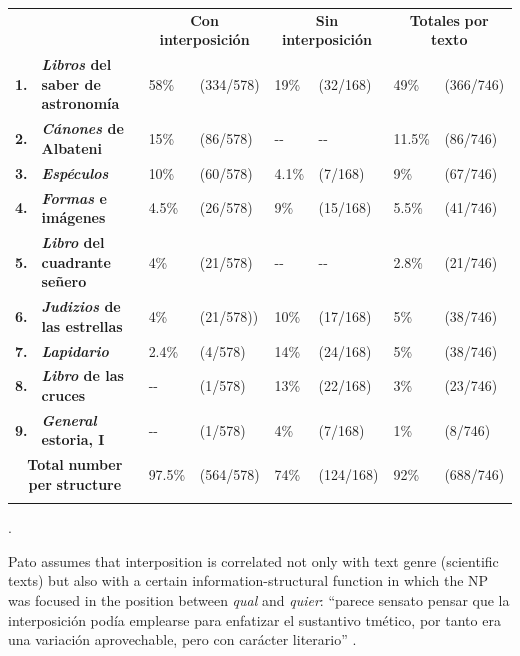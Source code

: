 \begin{table}
\begin{tabularx}{\textwidth}{XXXXXXXX}
\lsptoprule
\multicolumn{1}{c}{} &  & \multicolumn{2}{c}{ \textbf{Con} \textbf{interposición}} & \multicolumn{2}{c}{ \textbf{Sin} \textbf{interposición}} & \multicolumn{2}{c}{ \textbf{Totales} \textbf{por} \textbf{texto}}\\
\textbf{1.} & \textbf{\textit{Libros} \textbf{del} \textbf{saber} \textbf{de} \textbf{astronomía}} & 58\% & (334/578) & 19\% & (32/168) & 49\% & (366/746)\\
\textbf{2.} & \textbf{\textit{Cánones} \textbf{de} \textbf{Albateni}} & 15\% & (86/578) & {}-{}- & {}-{}- & 11.5\% & (86/746)\\
\textbf{3.} & \textbf{\textit{Espéculos}} & 10\% & (60/578) & 4.1\% & (7/168) & 9\% & (67/746)\\
\textbf{4.} & \textbf{\textit{Formas} \textbf{e} \textbf{imágenes}} & 4.5\% & (26/578) & 9\% & (15/168) & 5.5\% & (41/746)\\
\textbf{5.} & \textbf{\textit{Libro} \textbf{del} \textbf{cuadrante} \textbf{señero}} & 4\% & (21/578) & {}-{}- & {}-{}- & 2.8\% & (21/746)\\
\textbf{6.} & \textbf{\textit{Judizios} \textbf{de} \textbf{las} \textbf{estrellas}} & 4\% & (21/578)) & 10\% & (17/168) & 5\% & (38/746)\\
\textbf{7.} & \textbf{\textit{Lapidario}} & 2.4\% & (4/578) & 14\% & (24/168) & 5\% & (38/746)\\
\textbf{8.} & \textbf{\textit{Libro} \textbf{de} \textbf{las} \textbf{cruces}} & {}-{}- & (1/578) & 13\% & (22/168) & 3\% & (23/746)\\
\textbf{9.} & \textbf{\textit{General} \textbf{estoria,} \textbf{I}} & {}-{}- & (1/578) & 4\% & (7/168) & 1\% & (8/746)\\
\multicolumn{2}{c}{\textbf{Total} \textbf{number} \textbf{per} \textbf{structure} } & 97.5\% & (564/578) & 74\% & (124/168) & 92\% & (688/746)\\
\lspbottomrule
\end{tabularx}
\caption{\label{tab:} ~}\citet[282]{Pato2012}.
\end{table}

Pato assumes that interposition is correlated not only with text genre (scientific texts) but also with a certain information-structural function in which the NP was focused in the position between \textit{qual} and \textit{quier}: “parece sensato pensar que la interposición podía emplearse para enfatizar el sustantivo tmético, por tanto era una variación aprovechable, pero con carácter literario” \citep[284]{Pato2012}.

